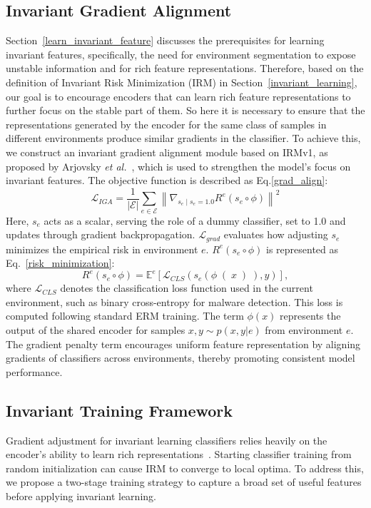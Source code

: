 \subsection{Invariant Gradient Alignment}
Section~\ref{learn_invariant_feature} discusses the prerequisites for learning invariant features, specifically, the need for environment segmentation to expose unstable information and for rich feature representations. Therefore, based on the definition of Invariant Risk Minimization (IRM) in Section~\ref{invariant_learning}, our goal is to encourage encoders that can learn rich feature representations to further focus on the stable part of them. So here it is necessary to ensure that the representations generated by the encoder for the same class of samples in different environments produce similar gradients in the classifier. To achieve this, we construct an invariant gradient alignment module based on IRMv1, as proposed by Arjovsky \textit{et al.}~\cite{IRM_training}, which is used to strengthen the model's focus on invariant features. The objective function is described as Eq.\ref{grad_align}:
\begin{equation}
\label{grad_align}
\mathcal{L}_{IGA} = \frac{1}{|\mathcal{E}|} \sum_{e \in \mathcal{E}} \left\|\nabla_{s_{e} \mid s_{e}=1.0} R^{e}(s_e \circ \phi)\right\|^2
\end{equation}
Here, $s_{e}$ acts as a scalar, serving the role of a dummy classifier, set to 1.0 and updates through gradient backpropagation. $\mathcal{L}_{grad}$ evaluates how adjusting $s_e$ minimizes the empirical risk in environment $e$. $R^e(s_e \circ \phi)$ is represented as Eq.~\ref{risk_minimization}:
\begin{equation}
\label{risk_minimization}
R^{e}(s_{e} \circ \phi)=\mathbb{E}^{e}\left[\mathcal{L}_{CLS} \left(s_{e}\left(\phi\right(x\left)\right), y\right)\right],
\end{equation}
where $\mathcal{L}_{CLS}$ denotes the classification loss function used in the current environment, such as binary cross-entropy for malware detection. This loss is computed following standard ERM training. The term $\phi(x)$ represents the output of the shared encoder for samples $x, y \sim p(x, y|e)$ from environment $e$. The gradient penalty term encourages uniform feature representation by aligning gradients of classifiers across environments, thereby promoting consistent model performance.

\subsection{Invariant Training Framework}
\label{invariant training}
Gradient adjustment for invariant learning classifiers relies heavily on the encoder’s ability to learn rich representations~\cite{rich}. Starting classifier training from random initialization can cause IRM to converge to local optima. To address this, we propose a two-stage training strategy to capture a broad set of useful features before applying invariant learning.


